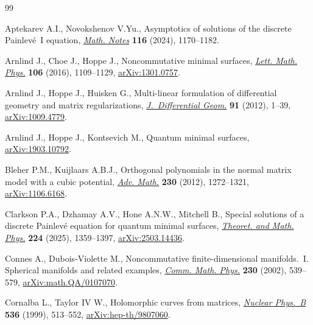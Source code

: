 \documentclass[pdftex]{sigma}
\numberwithin{equation}{section}
\theoremstyle{definition}
\begin{document}
\begin{thebibliography}{99}
\footnotesize\itemsep=0pt

Aptekarev A.I., Novokshenov V.Yu., Asymptotics of solutions of the discrete
 {P}ainlev\'e~{I} equation,
 \href{https://doi.org/10.4213/mzm14491}{\textit{Math. Notes}} \textbf{116}
 (2024), 1170--1182.

Arnlind J., Choe J., Hoppe J., Noncommutative minimal surfaces,
 \href{https://doi.org/10.1007/s11005-016-0861-7}{\textit{Lett. Math. Phys.}}
 \textbf{106} (2016), 1109--1129,
 \href{http://arxiv.org/abs/1301.0757}{arXiv:1301.0757}.

Arnlind J., Hoppe J., Huisken G., Multi-linear formulation of differential
 geometry and matrix regularizations,
 \href{https://doi.org/10.4310/jdg/1343133699}{\textit{J.~Differential Geom.}}
 \textbf{91} (2012), 1--39,
 \href{http://arxiv.org/abs/1009.4779}{arXiv:1009.4779}.

Arnlind J., Hoppe J., Kontsevich M., Quantum minimal surfaces,
 \href{http://arxiv.org/abs/1903.10792}{arXiv:1903.10792}.

Bleher P.M., Kuijlaars A.B.J., Orthogonal polynomials in the normal matrix
 model with a cubic potential,
 \href{https://doi.org/10.1016/j.aim.2012.03.021}{\textit{Adv. Math.}}
 \textbf{230} (2012), 1272--1321,
 \href{http://arxiv.org/abs/1106.6168}{arXiv:1106.6168}.

Clarkson P.A., Dzhamay A.V., Hone A.N.W., Mitchell B., Special solutions of a
 discrete {P}ainlev\'e equation for quantum minimal surfaces,
 \href{https://doi.org/10.1134/S0040577925080045}{\textit{Theoret. and Math.
 Phys.}} \textbf{224} (2025), 1359--1397,
 \href{http://arxiv.org/abs/2503.14436}{arXiv:2503.14436}.

Connes A., Dubois-Violette M., Noncommutative finite-dimensional
 manifolds.~{I}. {S}pherical manifolds and related examples,
 \href{https://doi.org/10.1007/s00220-002-0715-2}{\textit{Comm. Math. Phys.}}
 \textbf{230} (2002), 539--579,
 \href{http://arxiv.org/abs/math.QA/0107070}{arXiv:math.QA/0107070}.

Cornalba L., Taylor IV W., Holomorphic curves from matrices,
 \href{https://doi.org/10.1016/S0550-3213(98)00702-0}{\textit{Nuclear
 Phys.~B}} \textbf{536} (1999), 513--552,
 \href{http://arxiv.org/abs/hep-th/9807060}{arXiv:hep-th/9807060}.


\end{thebibliography}
\end{document}
